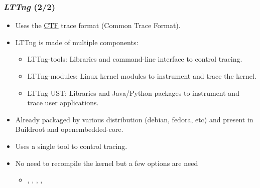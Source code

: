 \begin{frame}
  \frametitle{{\em LTTng} (2/2)}
  \begin{itemize}
    \item Uses the \href{https://diamon.org/ctf/}{CTF} trace format (Common
          Trace Format).
    \item LTTng is made of multiple components:
    \begin{itemize}
      \item LTTng-tools: Libraries and command-line interface to control tracing.
      \item LTTng-modules: Linux kernel modules to instrument and trace the kernel.
      \item LTTng-UST: Libraries and Java/Python packages to instrument and trace user applications.
    \end{itemize}
    \item Already packaged by various distribution (debian, fedora, etc) and
          present in Buildroot and openembedded-core.
    \item Uses a single tool  to control tracing.
    \item No need to recompile the kernel but a few options are need
    \begin{itemize}
      \item {}, , ,
            , 
    \end{itemize}
  \end{itemize}
\end{frame}

